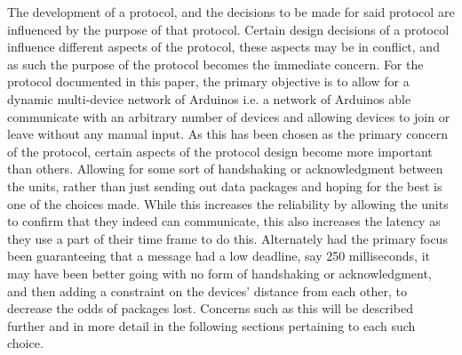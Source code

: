 The development of a protocol, and the decisions to be made for said protocol are influenced by the purpose of that protocol.
Certain design decisions of a protocol influence different aspects of the protocol, these aspects may be in conflict, and as such the purpose of the protocol becomes the immediate concern.
For the protocol documented in this paper, the primary objective is to allow for a dynamic multi-device network of Arduinos i.e. a network of Arduinos able communicate with an arbitrary number of devices and allowing devices to join or leave without any manual input.
As this has been chosen as the primary concern of the protocol, certain aspects of the protocol design become more important than others.
Allowing for some sort of handshaking or acknowledgment between the units, rather than just sending out data packages and hoping for the best is one of the choices made.
While this increases the reliability by allowing the units to confirm that they indeed can communicate, this also increases the latency as they use a part of their time frame to do this.
Alternately had the primary focus been guaranteeing that a message had a low deadline, say 250 milliseconds, it may have been better going with no form of handshaking or acknowledgment, and then adding a constraint on the devices' distance from each other, to decrease the odds of packages lost.
Concerns such as this will be described further and in more detail in the following sections pertaining to each such choice.
